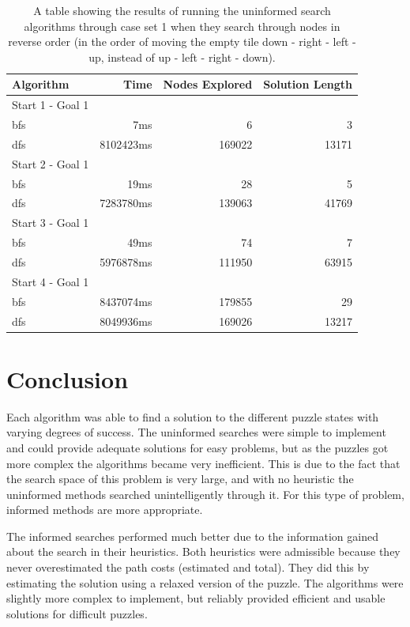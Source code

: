 \documentclass[12pt]{article}
\begin{document}
\begin{table}[h]
\centering
 	\begin{tabular}{l r r r}
   		Algorithm &     Time & Nodes Explored & Solution Length \\
   			\hline
   			Start 1 - Goal 1 \\
   			\hline
   		bfs & 7ms & 6 & 3 \\
   		dfs & 8102423ms & 169022 & 13171 \\
   		
   			\hline
   			Start 2 - Goal 1 \\
   			\hline
   		bfs & 19ms & 28 & 5 \\
   		dfs & 7283780ms & 139063 & 41769 \\	
   				
   			\hline
   			Start 3 - Goal 1 \\
   			\hline
   		bfs & 49ms & 74 & 7 \\
   		dfs & 5976878ms & 111950 & 63915 \\
   		
   			\hline
   			Start 4 - Goal 1 \\
   			\hline
   		bfs & 8437074ms & 179855 & 29 \\
   		dfs & 8049936ms & 169026 & 13217 \\ 		
  	\end{tabular}
  	
  	\caption{A table showing the results of running the uninformed search algorithms through case set 1 when they search through nodes in reverse order (in the order of moving the empty tile down - right - left - up, instead of up - left - right - down).}
  	\label{tbl:DataSet1alt}
\end{table}

\section{Conclusion}
Each algorithm was able to find a solution to the different puzzle states with varying degrees of success. The uninformed searches were simple to implement and could provide adequate solutions for easy problems, but as the puzzles got more complex the algorithms became very inefficient. This is due to the fact that the search space of this problem is very large, and with no heuristic the uninformed methods searched unintelligently through it. For this type of problem, informed methods are more appropriate.

The informed searches performed much better due to the information gained about the search in their heuristics. Both heuristics were admissible because they never overestimated the path costs (estimated and total). They did this by estimating the solution using a relaxed version of the puzzle. The algorithms were slightly more complex to implement, but reliably provided efficient and usable solutions for difficult puzzles. 
\end{document}
